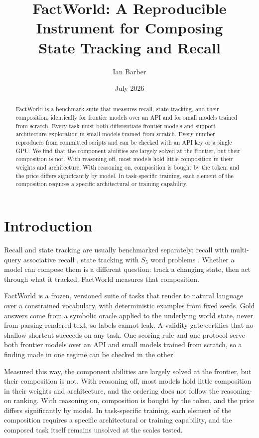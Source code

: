 \documentclass[11pt]{article}
\title{\textbf{FactWorld: A Reproducible Instrument for Composing\\State Tracking and Recall}}
\author{Ian Barber}
\date{July 2026}
\newcommand{\Sfive}{$S_5$}
\begin{document}
\maketitle

\begin{abstract}
FactWorld is a benchmark suite that measures recall, state tracking, and their composition,
identically for frontier models over an API and for small models trained from scratch. Every task must both differentiate frontier models and support architecture exploration in small models trained from scratch. Every number reproduces from committed scripts and can be checked with an API
key or a single GPU. We find that the component abilities are largely solved at the frontier,
but their composition is not. With reasoning off, most models hold little composition in their
weights and architecture. With reasoning on, composition is bought by the token, and the price
differs significantly by model. In task-specific training, each element of the composition
requires a specific architectural or training capability.
\end{abstract}

\section{Introduction}

Recall and state tracking are usually benchmarked separately: recall with multi-query associative recall \citep{arora2023zoology}, state tracking with \Sfive{} word problems \citep{barrington1989,liu2023}. Whether a model can compose them is a different question: track a changing state, then act through what it tracked. FactWorld measures that composition.

FactWorld is a frozen, versioned suite of tasks that render to natural language over a
constrained vocabulary, with deterministic examples from fixed seeds. Gold answers come from a
symbolic oracle applied to the underlying world state, never from parsing rendered text, so
labels cannot leak. A validity gate certifies that no shallow shortcut succeeds on any task. One scoring rule and one protocol serve both frontier models over an API and small
models trained from scratch, so a finding made in one regime can be checked in the other.

Measured this way, the component abilities are largely solved at the frontier, but their
composition is not. With reasoning off, most models hold little composition in their weights
and architecture, and the ordering does not follow the reasoning-on ranking. With reasoning
on, composition is bought by the token, and the price differs significantly by model. In
task-specific training, each element of the composition requires a specific architectural or
training capability, and the composed task itself remains unsolved at the scales tested.
\end{document}
